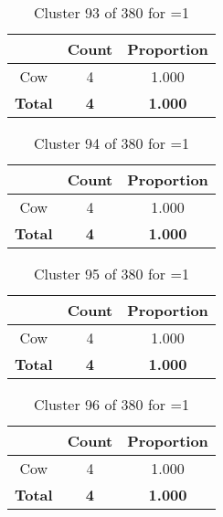 \begin{table}[ht!]
\centering
\begin{tabular}{|c|c|c|}
\hline
\bf \Spec{} &\bf Count &\bf Proportion\\ \hline \hline
Cow & 4 & 1.000\\ \hline
\hline
\bf Total & \bf 4 & \bf 1.000\\ \hline
\end{tabular}
\label{tab:cluster:93:1}
\caption{Cluster 93 of 380 for \minneigh{}=1}
\end{table}

\begin{table}[ht!]
\centering
\begin{tabular}{|c|c|c|}
\hline
\bf \Spec{} &\bf Count &\bf Proportion\\ \hline \hline
Cow & 4 & 1.000\\ \hline
\hline
\bf Total & \bf 4 & \bf 1.000\\ \hline
\end{tabular}
\label{tab:cluster:94:1}
\caption{Cluster 94 of 380 for \minneigh{}=1}
\end{table}

\begin{table}[ht!]
\centering
\begin{tabular}{|c|c|c|}
\hline
\bf \Spec{} &\bf Count &\bf Proportion\\ \hline \hline
Cow & 4 & 1.000\\ \hline
\hline
\bf Total & \bf 4 & \bf 1.000\\ \hline
\end{tabular}
\label{tab:cluster:95:1}
\caption{Cluster 95 of 380 for \minneigh{}=1}
\end{table}

\begin{table}[ht!]
\centering
\begin{tabular}{|c|c|c|}
\hline
\bf \Spec{} &\bf Count &\bf Proportion\\ \hline \hline
Cow & 4 & 1.000\\ \hline
\hline
\bf Total & \bf 4 & \bf 1.000\\ \hline
\end{tabular}
\label{tab:cluster:96:1}
\caption{Cluster 96 of 380 for \minneigh{}=1}
\end{table}

